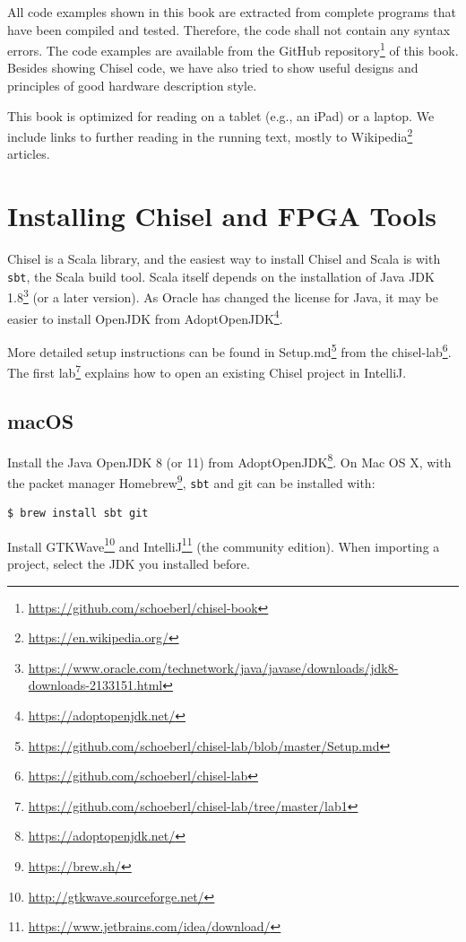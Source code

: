 \documentclass[%
    10pt,
    headinclude, footexclude,
    openright, %
    notitlepage,
    cleardoubleempty,
    headsepline,
    pointlessnumbers,
    bibtotoc, idxtotoc,
    ]{scrbook}
\newcommand{\code}[1]{{\lstinline[basicstyle=\small\ttfamily]{#1}}}
\newcommand{\myref}[2]{\href{#1}{#2}}
\renewcommand{\myref}[2]{{#2}{\footnote{\url{#1}}}}
\begin{document}
All code examples shown in this book are extracted from complete programs
that have been compiled and tested. Therefore, the code shall not contain
any syntax errors. The code examples are available from the
\myref{https://github.com/schoeberl/chisel-book}{GitHub repository}
of this book.
Besides showing Chisel code, we have also tried to show useful designs and
principles of good hardware description style.

This book is optimized for reading on a tablet (e.g., an iPad) or a laptop.
We include links to further reading in the running text, mostly to
\myref{https://en.wikipedia.org/}{Wikipedia} articles.

\section{Installing Chisel and FPGA Tools}

Chisel is a Scala library, and the easiest way to install Chisel and Scala is
with \code{sbt}, the Scala build tool. Scala itself depends on the installation
of \myref{https://www.oracle.com/technetwork/java/javase/downloads/jdk8-downloads-2133151.html}{Java JDK 1.8}
(or a later version).
As Oracle has changed the license for Java, it may be easier to
install OpenJDK from \myref{https://adoptopenjdk.net/}{AdoptOpenJDK}.

More detailed setup instructions can be found in
\myref{https://github.com/schoeberl/chisel-lab/blob/master/Setup.md}{Setup.md}
from the \myref{https://github.com/schoeberl/chisel-lab}{chisel-lab}.
The \myref{https://github.com/schoeberl/chisel-lab/tree/master/lab1}{first lab}
explains how to open an existing Chisel project in IntelliJ.

\subsection{macOS}

Install the Java OpenJDK 8 (or 11) from \myref{https://adoptopenjdk.net/}{AdoptOpenJDK}.
On Mac OS X, with the packet manager \myref{https://brew.sh/}{Homebrew},
\code{sbt} and git can be installed with:

\begin{verbatim}
$ brew install sbt git
\end{verbatim}

Install \myref{http://gtkwave.sourceforge.net/}{GTKWave} and
\myref{https://www.jetbrains.com/idea/download/}{IntelliJ} (the community edition).
When importing a project, select the JDK you installed before.
\end{document}
